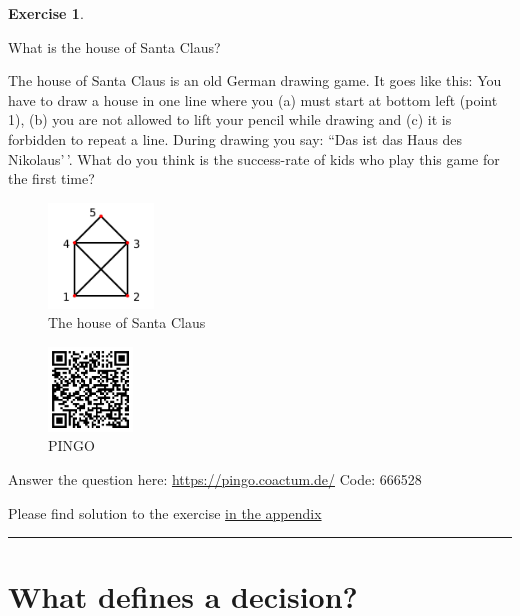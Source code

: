 \documentclass[
  12pt,
  oneside]{book}
\theoremstyle{definition}
\theoremstyle{definition}
\theoremstyle{definition}
\newtheorem{exercise}{Exercise}[chapter]
\theoremstyle{definition}
\theoremstyle{remark}
\begin{document}
\begin{exercise}
\protect\hypertarget{exr:santa}{}\label{exr:santa}

What is the house of Santa Claus?

The house of Santa Claus is an old German drawing game. It goes like this: You have to draw a house in one line where you (a) must start at bottom left (point 1), (b) you are not allowed to lift your pencil while drawing and (c) it is forbidden to repeat a line. During drawing you say: ``Das ist das Haus des Nikolaus'\,'. What do you think is the success-rate of kids who play this game for the first time?

\begin{figure}
\centering
\includegraphics[width=0.25\textwidth,height=\textheight]{fig/nikolaus.png}
\caption{\label{fig:nikolaus} The house of Santa Claus}
\end{figure}

\begin{figure}
\centering
\includegraphics[width=0.2\textwidth,height=\textheight]{fig/pingo666528.png}
\caption{\label{fig:pingo} PINGO}
\end{figure}

Answer the question here:
\url{https://pingo.coactum.de/}
Code: 666528

Please find solution to the exercise \protect\hyperlink{sol:santa}{in the appendix}

\begin{center}\rule{0.5\linewidth}{0.5pt}\end{center}

\end{exercise}

\hypertarget{what-defines-a-decision}{%
\section{What defines a decision?}\label{what-defines-a-decision}}
\end{document}
